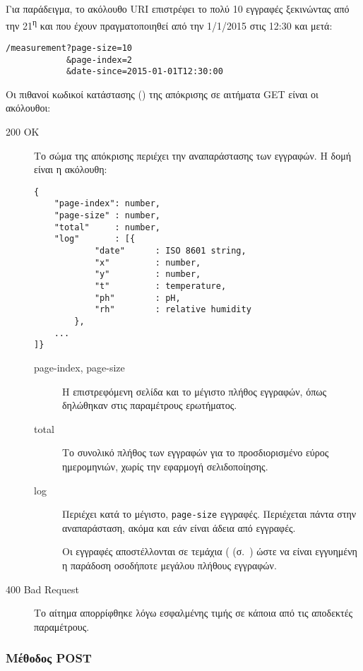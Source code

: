 Για παράδειγμα, το ακόλουθο URI επιστρέφει το πολύ 10 εγγραφές ξεκινώντας από
την 21\textsuperscript{η} και που έχουν πραγματοποιηθεί από την 1/1/2015 στις
12:30 και μετά:
\begin{lstlisting}
/measurement?page-size=10
            &page-index=2
            &date-since=2015-01-01T12:30:00
\end{lstlisting}

Οι πιθανοί κωδικοί κατάστασης () της απόκρισης σε αιτήματα GET
είναι οι ακόλουθοι:
\begin{description}
    \item[200 OK] Το σώμα της απόκρισης περιέχει την αναπαράστασης των εγγραφών.
    Η δομή είναι η ακόλουθη:
    \begin{lstlisting}
{
    "page-index": number,
    "page-size" : number,
    "total"     : number,
    "log"       : [{
            "date"      : ISO 8601 string,
            "x"         : number,
            "y"         : number,
            "t"         : temperature,
            "ph"        : pH,
            "rh"        : relative humidity
        },
    ...
]}
    \end{lstlisting}
    \begin{description}
        \item[page-index, page-size] Η επιστρεφόμενη σελίδα και το μέγιστο
        πλήθος εγγραφών, όπως δηλώθηκαν στις παραμέτρους ερωτήματος.

        \item[total] Το συνολικό πλήθος των εγγραφών για το προσδιορισμένο
        εύρος ημερομηνιών, χωρίς την εφαρμογή σελιδοποίησης.

        \item[log] Περιέχει κατά το μέγιστο, \verb~page-size~ εγγραφές.
        Περιέχεται πάντα στην αναπαράσταση, ακόμα και εάν είναι άδεια από
        εγγραφές.

        Οι εγγραφές αποστέλλονται σε τεμάχια
        (
        (σ.~\pageref{ssubsec:network:chunked-output}) ώστε να είναι εγγυημένη η
        παράδοση οσοδήποτε μεγάλου πλήθους εγγραφών.
    \end{description}

    \item[400 Bad Request] Το αίτημα απορρίφθηκε λόγω εσφαλμένης τιμής σε κάποια
    από τις αποδεκτές παραμέτρους.
\end{description}


\subsubsection{Μέθοδος POST}
\label{ssubsec:network:measurement-post}

